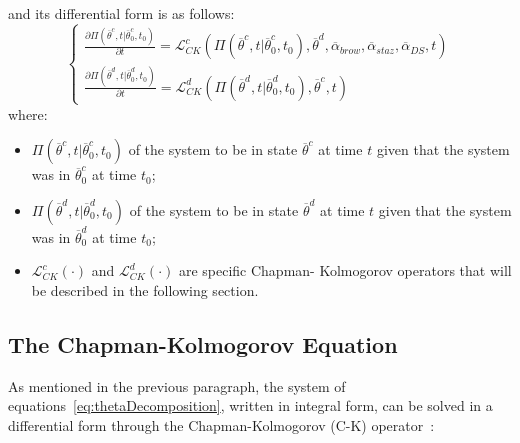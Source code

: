 and its differential form is as follows:
\begin{equation}
\label{eq:chapKolmogDiffFormContDisct}
\left\{\begin{matrix}
\frac{\partial \Pi \left (\overline{\theta}^{c},t|\overline{\theta}_{0}^{c},t_{0}  
\right ) }{\partial t} = \mathcal{L}_{CK}^{c}  \left (     \Pi \left 
(\overline{\theta}^{c},t|\overline{\theta}_{0}^{c},t_{0} \right ), 
\overline{\theta}^{d},\overline{\alpha}_{brow},\overline{\alpha}_{staz},
\overline{\alpha}_{DS},t  \right )
\\ 
\frac{\partial \Pi \left (\overline{\theta}^{d},t|\overline{\theta}_{0}^{d},t_{0}  
\right ) }{\partial t} = \mathcal{L}_{CK}^{d}  \left (     \Pi \left 
(\overline{\theta}^{d},t|\overline{\theta}_{0}^{d},t_{0} \right ), 
\overline{\theta}^{c},t  \right )
\end{matrix}\right.
\end{equation}
where:
\begin{itemize}
 \item  $\Pi \left (\overline{\theta}^{c},t|\overline{\theta}_{0}^{c},t_{0} \right 
 )$ of the system to be in state $\overline{\theta}^{c}$ at time $t$ given that 
 the system was in $\overline{\theta}^{c}_{0}$ at time $t_{0}$;
 \item $\Pi \left (\overline{\theta}^{d},t|\overline{\theta}_{0}^{d},t_{0} \right 
 )$ of the system to be in state $\overline{\theta}^{d}$ at time $t$ given 
 that the system was in $\overline{\theta}^{d}_{0}$ at time $t_{0}$;
 \item $\mathcal{L}_{CK}^{c} \left ( \cdot  \right )$ and 
 $\mathcal{L}_{CK}^{d} \left ( \cdot  \right )$  are specific Chapman-
 Kolmogorov operators that will be described in the following section.
\end{itemize}
%
%
%
%
%
\subsection{The Chapman-Kolmogorov Equation}
\label{sec:ChapmanKolmogorov }
As mentioned in the previous paragraph, the system of equations~\ref{eq:thetaDecomposition}, written in integral 
form, can be solved in a differential form through the Chapman-Kolmogorov (C-K) 
operator~\cite{ProbReactoDynamicsDevooght}:

